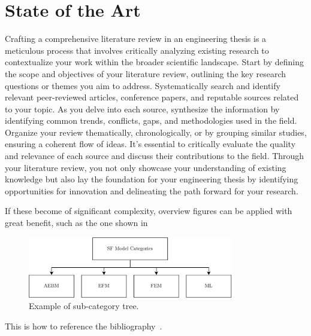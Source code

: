 \chapter{State of the Art} \label{ch:state-of-the-art}

Crafting a comprehensive literature review in an engineering thesis is a meticulous process that involves critically analyzing existing research to contextualize your work within the broader scientific landscape. Start by defining the scope and objectives of your literature review, outlining the key research questions or themes you aim to address. Systematically search and identify relevant peer-reviewed articles, conference papers, and reputable sources related to your topic. As you delve into each source, synthesize the information by identifying common trends, conflicts, gaps, and methodologies used in the field. Organize your review thematically, chronologically, or by grouping similar studies, ensuring a coherent flow of ideas. It's essential to critically evaluate the quality and relevance of each source and discuss their contributions to the field. Through your literature review, you not only showcase your understanding of existing knowledge but also lay the foundation for your engineering thesis by identifying opportunities for innovation and delineating the path forward for your research. \medskip

If these become of significant complexity, overview figures can be applied with great benefit, such as the one shown in~

\begin{figure}[h]
	\begin{small}
		\begin{center}
			\includegraphics[width=0.8\textwidth]{img/sf-categories.pdf}
		\end{center}
		\caption{Example of sub-category tree.}
		\label{fig:sota-example}
	\end{small}
\end{figure}

This is how to reference the bibliography~\cite{3d-object-pose-estimation-using-stereo-vision-for-object-manipulation-system}. \medskip

